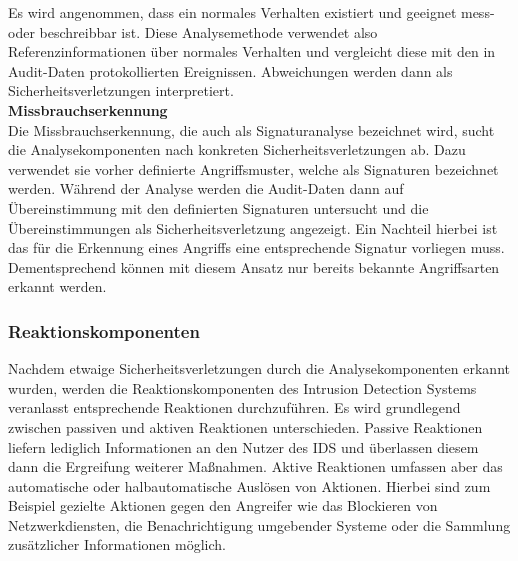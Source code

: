 \documentclass[11pt]{scrartcl}
\begin{document}
Es wird angenommen, dass ein normales Verhalten existiert und geeignet mess- oder beschreibbar ist. Diese Analysemethode verwendet also Referenzinformationen über normales Verhalten und
vergleicht diese mit den in Audit-Daten protokollierten Ereignissen. Abweichungen
werden dann als Sicherheitsverletzungen interpretiert.\\

\textbf{Missbrauchserkennung}\\
Die Missbrauchserkennung, die auch als Signaturanalyse
bezeichnet wird, sucht die Analysekomponenten nach konkreten Sicherheitsverletzungen ab. Dazu verwendet sie vorher definierte Angriffsmuster, welche als Signaturen bezeichnet werden. Während der Analyse werden die Audit-Daten dann auf Übereinstimmung mit den definierten
Signaturen untersucht und die Übereinstimmungen als Sicherheitsverletzung
angezeigt. Ein Nachteil hierbei ist das für die Erkennung eines Angriffs eine entsprechende Signatur vorliegen muss. Dementsprechend können mit diesem Ansatz nur bereits bekannte Angriffsarten erkannt werden.\\
\subsubsection{Reaktionskomponenten}
\label{sec:reaction}
Nachdem etwaige Sicherheitsverletzungen durch die Analysekomponenten erkannt
wurden, werden die Reaktionskomponenten des Intrusion Detection Systems veranlasst entsprechende
Reaktionen durchzuführen. Es wird grundlegend zwischen passiven
und aktiven Reaktionen unterschieden. Passive Reaktionen liefern lediglich Informationen
an den Nutzer des IDS und überlassen diesem dann die Ergreifung
weiterer Maßnahmen. Aktive Reaktionen umfassen aber das automatische oder
halbautomatische Auslösen von Aktionen. Hierbei sind zum Beispiel gezielte Aktionen gegen den Angreifer wie das Blockieren von Netzwerkdiensten, die Benachrichtigung umgebender Systeme oder die Sammlung zusätzlicher Informationen möglich. \cite{5}
\end{document}
